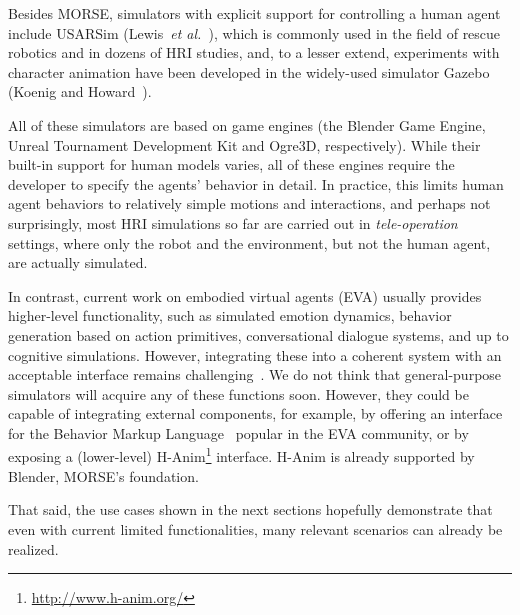 \documentclass{llncs}
\newcommand{\etal}{{\textit{et al.~}}}
\begin{document}
Besides MORSE, simulators with explicit support for controlling a human agent
include USARSim (Lewis~\etal\cite{lewis2007usarsim}), which is commonly used in
the field of rescue robotics and in dozens of HRI studies, and, to a
lesser extend, experiments with character animation have been developed in the
widely-used simulator Gazebo (Koenig and Howard~\cite{Koenig2004}).


%

All of these simulators are based on game engines (the Blender Game Engine,
Unreal Tournament Development Kit and Ogre3D, respectively). While their
built-in support for human models varies, all of these engines require the
developer to specify the agents' behavior in detail. In practice, this limits
human agent behaviors to relatively simple motions and interactions, and perhaps
not surprisingly, most HRI simulations so far are carried out in
\emph{tele-operation} settings, where only the robot and the environment, but
not the human agent, are actually simulated.

In contrast, current work on embodied virtual agents (EVA) usually provides 
higher-level functionality, such as simulated emotion dynamics, behavior 
generation based on action primitives, conversational dialogue systems, and
up to cognitive simulations. However, integrating these into a coherent 
system with an acceptable interface remains 
challenging~\cite{gratch2002creating}. We do not think that general-purpose
simulators will acquire any of these functions soon. However, they could be
capable of integrating external components, for example, by offering 
an interface for the Behavior Markup Language~\cite{kopp2006towards} popular
in the EVA community, or by exposing a (lower-level) 
H-Anim\footnote{\url{http://www.h-anim.org/}} interface. H-Anim is already
supported by Blender, MORSE's foundation.

That said, the use cases shown in the next sections hopefully demonstrate that
even with current limited functionalities, many relevant scenarios can already
be realized.
\end{document}
